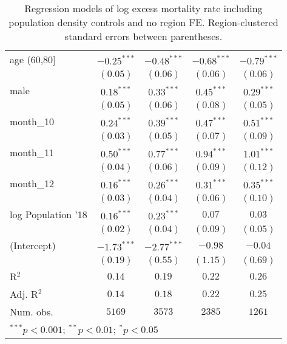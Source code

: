 \begin{table}
\begin{center}
\begin{small}
\begin{tabular}{l c c c c}
age (60,80]        & $-0.25^{***}$ & $-0.48^{***}$ & $-0.68^{***}$ & $-0.79^{***}$ \\
                   & $(0.05)$      & $(0.06)$      & $(0.06)$      & $(0.06)$      \\
male               & $0.18^{***}$  & $0.33^{***}$  & $0.45^{***}$  & $0.29^{***}$  \\
                   & $(0.05)$      & $(0.06)$      & $(0.08)$      & $(0.05)$      \\
month\_10          & $0.24^{***}$  & $0.39^{***}$  & $0.47^{***}$  & $0.51^{***}$  \\
                   & $(0.03)$      & $(0.05)$      & $(0.07)$      & $(0.09)$      \\
month\_11          & $0.50^{***}$  & $0.77^{***}$  & $0.94^{***}$  & $1.01^{***}$  \\
                   & $(0.04)$      & $(0.06)$      & $(0.09)$      & $(0.12)$      \\
month\_12          & $0.16^{***}$  & $0.26^{***}$  & $0.31^{***}$  & $0.35^{***}$  \\
                   & $(0.03)$      & $(0.04)$      & $(0.06)$      & $(0.10)$      \\
log Population '18 & $0.16^{***}$  & $0.23^{***}$  & $0.07$        & $0.03$        \\
                   & $(0.02)$      & $(0.04)$      & $(0.09)$      & $(0.05)$      \\
(Intercept)        & $-1.73^{***}$ & $-2.77^{***}$ & $-0.98$       & $-0.04$       \\
                   & $(0.19)$      & $(0.55)$      & $(1.15)$      & $(0.69)$      \\
\hline
R$^2$              & $0.14$        & $0.19$        & $0.22$        & $0.26$        \\
Adj. R$^2$         & $0.14$        & $0.18$        & $0.22$        & $0.25$        \\
Num. obs.          & $5169$        & $3573$        & $2385$        & $1261$        \\
\hline
\multicolumn{5}{l}{\tiny{$^{***}p<0.001$; $^{**}p<0.01$; $^{*}p<0.05$}}
\end{tabular}
\end{small}
\caption{Regression models of log excess mortality rate including population density controls and no region FE. Region-clustered standard errors between parentheses.}
\label{tab:popdensmodels}
\end{center}
\end{table}
